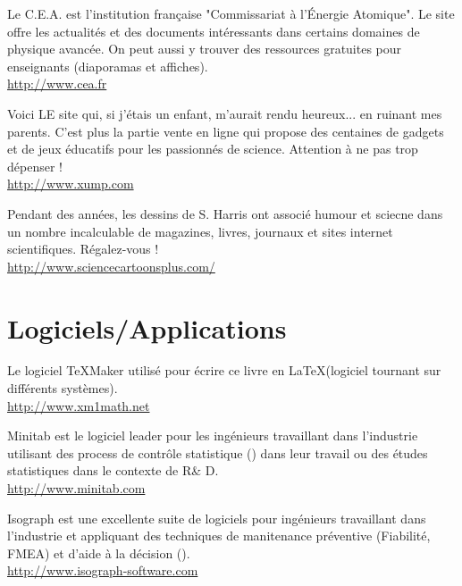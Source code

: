 	{\Large {}}{\Large {}} Le C.E.A. est l'institution française "Commissariat à l'Énergie Atomique". Le site offre les actualités et des documents intéressants dans certains domaines de physique avancée. On peut aussi y trouver des ressources gratuites pour enseignants (diaporamas et affiches).\\
	\href{http://www.cea.fr}{\color{blue}http://www.cea.fr}
	
	{\Large {}}{\Large {}} Voici LE site qui, si j'étais un enfant, m'aurait rendu heureux... en ruinant mes parents. C'est plus la partie vente en ligne qui propose des centaines de gadgets et de jeux éducatifs pour les passionnés de science. Attention à ne pas trop dépenser !\\
	\href{http://www.xump.com}{\color{blue}http://www.xump.com}
	
	{\Large {}}{\Large {}} Pendant des années, les dessins de S. Harris ont associé humour et sciecne dans un nombre incalculable de magazines, livres, journaux et sites internet scientifiques. Régalez-vous !\\
	\href{http://www.sciencecartoonsplus.com/}{\color{blue}http://www.sciencecartoonsplus.com/}
	
	\pagebreak
	\section{Logiciels/Applications}
	
	{\Large {}}{\Large {}}{\Large {}}{\Large {}} Le logiciel TeXMaker utilisé pour écrire ce livre en \LaTeX (logiciel tournant sur différents systèmes).\\
	\href{http://www.xm1math.net/texmaker/index.html}{\color{blue}http://www.xm1math.net}
	
	{\Large {}}{\Large {}}{\Large {}}{\Large {}} Minitab est le logiciel leader pour les ingénieurs travaillant dans l'industrie utilisant des process de contrôle statistique () dans leur travail ou des études statistiques dans le contexte de R\& D.\\
	\href{http://www.minitab.com}{\color{blue}http://www.minitab.com}
	
	{\Large {}}{\Large {}}{\Large {}}{\Large {}} Isograph est une excellente suite de logiciels pour ingénieurs travaillant dans l'industrie et appliquant des techniques de manitenance préventive (Fiabilité, FMEA) et d'aide à la décision ().\\
	\href{http://www.isograph-software.com}{\color{blue}http://www.isograph-software.com}
	
